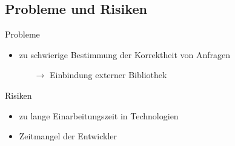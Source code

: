 \subsection{Probleme und Risiken}

\begin{frame}{\insertsectionhead}{\insertsubsectionhead}
  \begin{block}{Probleme}
    \begin{itemize}
      \item zu schwierige Bestimmung der Korrektheit von Anfragen
      \begin{itemize}
        \item [$\rightarrow$] Einbindung externer Bibliothek
      \end{itemize}
    \end{itemize}
  \end{block}
  \begin{block}{Risiken}
    \begin{itemize}
      \item zu lange Einarbeitungszeit in Technologien
      \item Zeitmangel der Entwickler
    \end{itemize}
  \end{block}
\end{frame}
